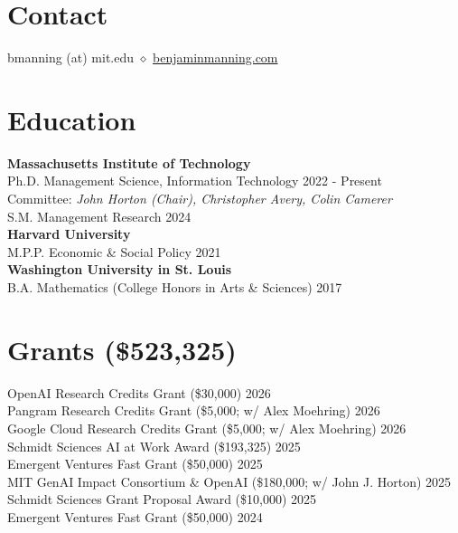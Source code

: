 \documentclass[margin,line,pifont,palatino,courier, 9pt]{res}
\begin{document}
\begin{resume}


\normalsize


\section{\sc Contact}
bmanning (at) mit.edu $\diamond$ \href{https://benjaminmanning.com/}{benjaminmanning.com}

\section{\sc Education}
{\bf Massachusetts Institute of Technology}\\
Ph.D. Management Science, Information Technology \hfill 2022 - Present\\
\hspace*{1.5em}Committee: \emph{John Horton (Chair), Christopher Avery, Colin Camerer}\\
S.M. Management Research \hfill 2024\vspace{2mm}\\
{\bf Harvard University}\\
M.P.P. Economic \& Social Policy \hfill 2021\vspace{2mm}\\
{\bf Washington University in St. Louis}\\
B.A. Mathematics (College Honors in Arts \& Sciences) \hfill 2017


\section{\sc Grants (\$523,325)}
OpenAI Research Credits Grant (\$30,000) \hfill 2026 \\
Pangram Research Credits Grant (\$5,000; w/ Alex Moehring) \hfill 2026 \\
Google Cloud Research Credits Grant (\$5,000; w/ Alex Moehring) \hfill 2026 \\
Schmidt Sciences AI at Work Award (\$193,325) \hfill 2025 \\
Emergent Ventures Fast Grant (\$50,000) \hfill 2025 \\
MIT GenAI Impact Consortium \& OpenAI (\$180,000; w/ John J. Horton) \hfill 2025 \\
Schmidt Sciences Grant Proposal Award (\$10,000) \hfill 2025 \\
Emergent Ventures Fast Grant (\$50,000) \hfill 2024 


\end{resume}
\end{document}
